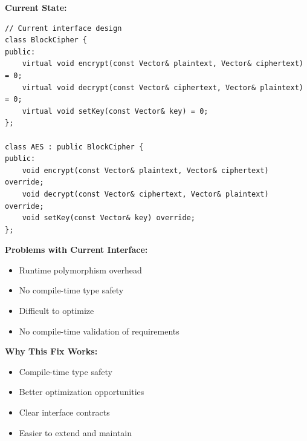 \documentclass[11pt,a4paper]{article}
\begin{document}
\textbf{Current State:}
\begin{lstlisting}
// Current interface design
class BlockCipher {
public:
    virtual void encrypt(const Vector& plaintext, Vector& ciphertext) = 0;
    virtual void decrypt(const Vector& ciphertext, Vector& plaintext) = 0;
    virtual void setKey(const Vector& key) = 0;
};

class AES : public BlockCipher {
public:
    void encrypt(const Vector& plaintext, Vector& ciphertext) override;
    void decrypt(const Vector& ciphertext, Vector& plaintext) override;
    void setKey(const Vector& key) override;
};
\end{lstlisting}

\textcolor{problemred}{\textbf{Problems with Current Interface:}}
\begin{itemize}
    \item Runtime polymorphism overhead
    \item No compile-time type safety
    \item Difficult to optimize
    \item No compile-time validation of requirements
\end{itemize}

\textcolor{solutiongreen}{\textbf{Why This Fix Works:}}
\begin{itemize}
    \item Compile-time type safety
    \item Better optimization opportunities
    \item Clear interface contracts
    \item Easier to extend and maintain
\end{itemize}
\end{document}
